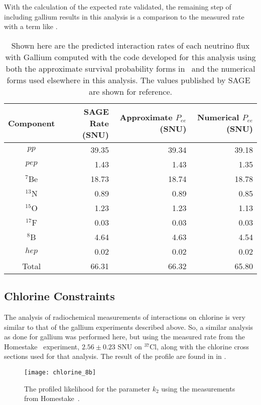 With the calculation of the expected rate validated, the remaining step of including gallium results in this analysis is a comparison to the measured rate with a term like .

\begin{table}
\centering
\begin{tabular}{c|r|r|r}
Component & SAGE Rate (SNU) & Approximate $P_{ee}$ (SNU) & Numerical $P_{ee}$ (SNU) \\ \hline
$pp$		& 39.35	&	39.34 	&	39.18	\\
$pep$		& 1.43 	&	1.43 	&	1.35 	\\ 
$^7$Be		& 18.73	&	18.74	& 	18.78	\\
$^{13}$N	& 0.89 	&	0.89	&	0.85	\\ 
$^{15}$O	& 1.23 	&	1.23	&	1.13	\\ 
$^{17}$F	& 0.03 	&	0.03	&	0.03	\\
$^8$B		& 4.64 	&	4.63	&	4.54	\\ 
$hep$		& 0.02 	&	0.02	&	0.02	\\ \hline
Total		& 66.31	&	66.32 	&	65.80	\\ \hline
\end{tabular}
\caption{\label{tbl:gallium}Shown here are the predicted interaction rates of each neutrino flux with Gallium computed with the code developed for this analysis using both the approximate survival probability forms in~\cite{sagecombo} and the numerical forms used elsewhere in this analysis. The values published by SAGE~\cite{sagecombo} are shown for reference.}
\end{table}

\subsection{Chlorine Constraints}

The analysis of radiochemical measurements of interactions on chlorine is very similar to that of the gallium experiments described above. 
So, a similar analysis as done for gallium was performed here, but using the measured rate from the Homestake~\cite{homestake} experiment, $2.56\pm0.23$ SNU on $^{37}$Cl, along with the chlorine cross sections used for that analysis.
The result of the profile are found in in .

\begin{figure}
\centering
\texttt{[image: chlorine\_8b]}
\caption{The profiled likelihood for the parameter $k_2$ using the measurements from Homestake~\cite{homestake}.}
\label{fig:cl_profiles}
\end{figure}



